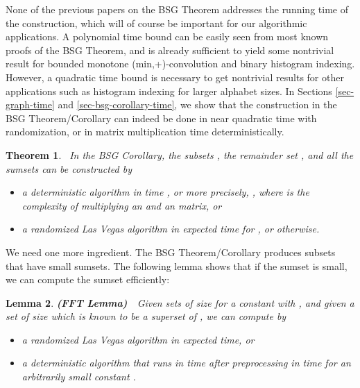 \documentclass[11pt]{article}
\newcommand{\LONG}[1]{#1}\newcommand{\SHORT}[1]{}
\newtheorem{theorem}{Theorem}[section]
\newtheorem{lemma}[theorem]{Lemma}
\begin{document}
None of the previous papers on the BSG Theorem addresses the running
time of the construction, which will of course be
important for our
algorithmic applications.  A polynomial time bound can be easily
seen from most known proofs of the BSG Theorem, and
is already sufficient to yield some nontrivial result
for bounded monotone (min,+)-convolution and
binary histogram indexing.  However, a quadratic time bound is necessary to get
nontrivial results for other applications such as histogram
indexing for larger alphabet sizes.
In \LONG{Sections \ref{sec-graph-time} and \ref{sec-bsg-corollary-time}}\SHORT{the full paper, using a number of additional
ideas (e.g., sampling tricks for sublinear algorithms)}, we
show that the construction in the BSG Theorem/Corollary
can indeed be done in near quadratic time
with randomization, or in matrix multiplication time deterministically.


\newcommand{\MM}{{\cal M}}

\begin{theorem}~\label{runtime-corollary}
In the BSG Corollary, the subsets , the remainder set ,
and all the sumsets  can be constructed by
\begin{itemize}
\item[\rm (i)] a deterministic algorithm in time ,
or more precisely, ,
where  is the complexity of multiplying
an  and an  matrix, or
\item[\rm (ii)] a randomized Las Vegas algorithm in expected
time  for , or   otherwise.
\end{itemize}
\end{theorem}




We need one more ingredient.  The BSG Theorem/Corollary produces
subsets that have small sumsets.  The following lemma shows
that if the sumset is small, we can compute
the sumset efficiently:

\begin{lemma} {\bf(FFT Lemma)}\ \ Given sets 
of size  for a constant  with , and
given a set  of size 
which is known to be a superset of , we can compute  by
\begin{itemize}
\item[\rm (i)] a randomized Las Vegas algorithm in  expected time, or
\item[\rm (ii)] a deterministic algorithm that runs in 
time after preprocessing  in  time for
an arbitrarily small constant .
\end{itemize}
\end{lemma}
\end{document}
